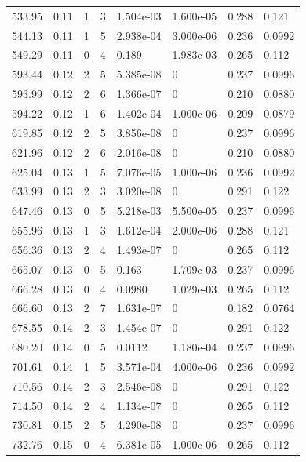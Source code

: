 \documentclass[preview]{standalone}
\begin{document}
{{{\begin{tabular}{L{1.2cm}C{1.2cm} C{0.3cm}C{0.5cm} C{1.4cm}C{1.4cm} C{1.4cm}C{1.4cm}}
  533.95  &  0.11  & 1     &  3 &  1.504e-03  & 1.600e-05  & 0.288 &  0.121   \\ 
  544.13  &  0.11  & 1     &  5 &  2.938e-04  & 3.000e-06  & 0.236 &  0.0992   \\ 
  549.29  &  0.11  & 0     &  4 &  0.189  & 1.983e-03  & 0.265 &  0.112   \\ 
  593.44  &  0.12  & 2     &  5 &  5.385e-08  & 0  & 0.237 &  0.0996   \\ 
  593.99  &  0.12  & 2     &  6 &  1.366e-07  & 0  & 0.210 &  0.0880   \\ 
  594.22  &  0.12  & 1     &  6 &  1.402e-04  & 1.000e-06  & 0.209 &  0.0879   \\ 
  619.85  &  0.12  & 2     &  5 &  3.856e-08  & 0  & 0.237 &  0.0996   \\ 
  621.96  &  0.12  & 2     &  6 &  2.016e-08  & 0  & 0.210 &  0.0880   \\ 
  625.04  &  0.13  & 1     &  5 &  7.076e-05  & 1.000e-06  & 0.236 &  0.0992   \\ 
  633.99  &  0.13  & 2     &  3 &  3.020e-08  & 0  & 0.291 &  0.122   \\ 
  647.46  &  0.13  & 0     &  5 &  5.218e-03  & 5.500e-05  & 0.237 &  0.0996   \\ 
  655.96  &  0.13  & 1     &  3 &  1.612e-04  & 2.000e-06  & 0.288 &  0.121   \\ 
  656.36  &  0.13  & 2     &  4 &  1.493e-07  & 0  & 0.265 &  0.112   \\ 
  665.07  &  0.13  & 0     &  5 &  0.163  & 1.709e-03  & 0.237 &  0.0996   \\ 
  666.28  &  0.13  & 0     &  4 &  0.0980  & 1.029e-03  & 0.265 &  0.112   \\ 
  666.60  &  0.13  & 2     &  7 &  1.631e-07  & 0  & 0.182 &  0.0764   \\ 
  678.55  &  0.14  & 2     &  3 &  1.454e-07  & 0  & 0.291 &  0.122   \\ 
  680.20  &  0.14  & 0     &  5 &  0.0112  & 1.180e-04  & 0.237 &  0.0996   \\ 
  701.61  &  0.14  & 1     &  5 &  3.571e-04  & 4.000e-06  & 0.236 &  0.0992   \\ 
  710.56  &  0.14  & 2     &  3 &  2.546e-08  & 0  & 0.291 &  0.122   \\ 
  714.50  &  0.14  & 2     &  4 &  1.134e-07  & 0  & 0.265 &  0.112   \\ 
  730.81  &  0.15  & 2     &  5 &  4.290e-08  & 0  & 0.237 &  0.0996   \\ 
  732.76  &  0.15  & 0     &  4 &  6.381e-05  & 1.000e-06  & 0.265 &  0.112   \\ 

\end{tabular}}}}
\end{document}
